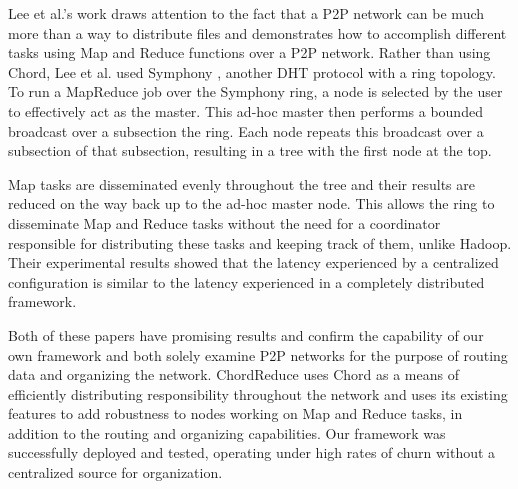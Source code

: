 Lee et al.'s work \cite{leemap} draws attention to the fact that a P2P network can be much more than a way to distribute files and demonstrates how to accomplish different tasks using Map and Reduce functions over a P2P network.  Rather than using Chord, Lee et al. used Symphony \cite{symphony}, another DHT protocol with a ring topology.  To run a MapReduce job over the Symphony ring, a node is selected by the user to effectively act as the master.  This ad-hoc master then performs a bounded broadcast over a subsection the ring.  Each node repeats this broadcast over a subsection of that subsection, resulting in a tree with the first node at the top.  

Map tasks are disseminated evenly throughout the tree and their results are reduced on the way back up to the ad-hoc master node.  This allows the ring to disseminate Map and Reduce tasks without the need for a coordinator responsible for distributing these tasks and keeping track of them, unlike Hadoop.  Their experimental results showed that the latency experienced by a centralized configuration is similar to the latency experienced in a completely distributed framework.







Both of these papers have promising results and confirm the capability of our own framework and both solely examine P2P networks for the purpose of routing data and organizing the network. ChordReduce uses Chord as a means of efficiently distributing responsibility throughout the network and uses its existing features to add robustness to nodes working on Map and Reduce tasks, in addition to the routing  and organizing capabilities.  Our framework was successfully deployed and tested, operating under high rates of churn without a centralized source for organization. %




